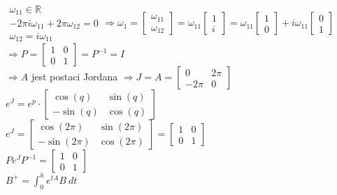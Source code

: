 $\begin{array}{r}\omega_{11} \in \mathbb{R}\\
-2\pi i \omega_{11}+2\pi \omega_{12}=0\\
\omega_{12}=i\omega_{11}\end{array} \Rightarrow \omega_1=\left[ \begin{array}{c}     \omega_{11}\\\omega_{12}    \end{array}\right]=
\omega_{11}\left[ \begin{array}{c}     1\\i    \end{array}\right]=
\omega_{11}\left[ \begin{array}{c}     1\\0    \end{array}\right]+ i\omega_{11}\left[ \begin{array}{c}     0\\1    \end{array}\right]$\\
$\Rightarrow P=\left[ \begin{array}{cc}     1&0\\0&1    \end{array}\right]=P^{-1}=I$\\
$\Rightarrow A$ jest postaci Jordana $\Rightarrow J=A=\left[ \begin{array}{cc}     0&2\pi\\-2\pi&0    \end{array}\right]$\\
$e^J=e^p \cdot\left[ \begin{array}{cc}     \cos(q)&\sin(q)\\-\sin(q)& \cos(q)   \end{array}\right]$\\
$e^J= \left[ \begin{array}{cc}     \cos(2\pi)&\sin(2\pi)\\-\sin(2\pi)& \cos(2\pi)   \end{array}\right]=\left[ \begin{array}{cc}     1&0\\0& 1   \end{array}\right]$\\
$Pe^JP^{-1}=\left[ \begin{array}{cc}     1&0\\0& 1   \end{array}\right]$\\
$B^+=\int^h_0e^{tA}B \ dt$\\
